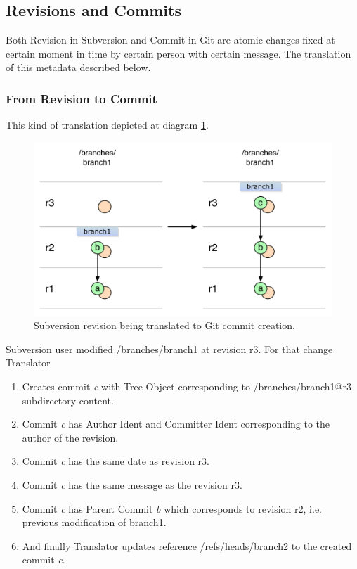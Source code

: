 \subsection{Revisions and Commits}

Both Revision in Subversion and Commit in Git are atomic changes fixed at certain moment in time by certain person with certain message. The translation of this metadata described below.

\subsubsection{From Revision to Commit}

This kind of translation depicted at diagram \ref{single_change_svn_to_git}.

\begin{figure}[!h]
\centering
\renewcommand{\figurename}{Diagram}
\includegraphics[width=\linewidth]{img/diagrams/single_change_svn_to_git.pdf}
\caption{Subversion revision being translated to Git commit creation.}
\label{single_change_svn_to_git}
\end{figure}

Subversion user modified /branches/branch1 at revision r3. For that change Translator
\begin{enumerate}
	\item Creates commit \emph{c} with Tree Object corresponding to /branches/branch1@r3 subdirectory content.
	\item Commit \emph{c} has Author Ident and Committer Ident corresponding to the author of the revision.
	\item Commit \emph{c} has the same date as revision r3.
	\item Commit \emph{c} has the same message as the revision r3.
	\item Commit \emph{c} has Parent Commit \emph{b} which corresponds to revision r2, i.e. previous modification of branch1.
	\item And finally Translator updates reference /refs/heads/branch2 to the created commit \emph{c}.
\end{enumerate}


